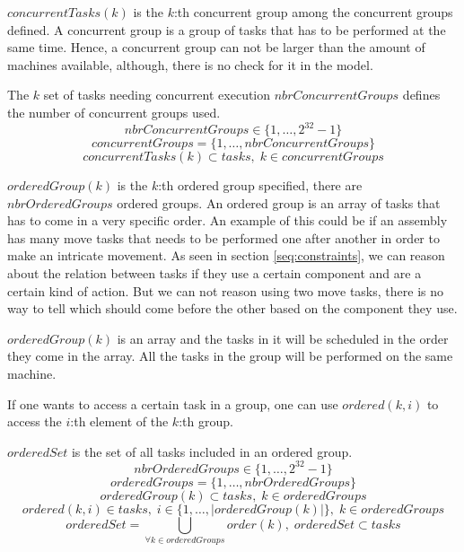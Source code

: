   \noindent $concurrentTasks(k)$ is the $k$:th concurrent group among the concurrent groups defined. A concurrent group is a group of tasks that has to be performed at the same time. Hence, a concurrent group can not be larger than the amount of machines available, although, there is no check for it in the model. 
 
 The $k$ set of tasks needing concurrent execution
 $nbrConcurrentGroups$ defines the number of concurrent groups used.  
 \begin{equation}\label{eq:8}
 nbrConcurrentGroups \in \{1 , \ldots , 2^{32}-1\}
 \end{equation}
 \begin{equation}\label{eq:17}
 concurrentGroups = \{1 , \ldots , nbrConcurrentGroups\}
 \end{equation}
 \begin{equation}\label{eq:30}
 concurrentTasks(k) \subset tasks, \; k \in concurrentGroups
 \end{equation}

  \noindent $orderedGroup(k)$ is the $k$:th ordered group specified, there are $nbrOrderedGroups$ ordered groups. An ordered group is an array of tasks that has to come in a very specific order. An example of this could be if an assembly has many move tasks that needs to be performed one after another in order to make an intricate movement. As seen in section \ref{seq:constraints}, we can reason about the relation between tasks if they use a certain component and are a certain kind of action. But we can not reason using two move tasks, there is no way to tell which should come before the other based on the component they use. 
  
  $orderedGroup(k)$ is an array and the tasks in it will be scheduled in the order they come in the array. All the tasks in the group will be performed on the same machine.
  
  If one wants to access a certain task in a group, one can use $ordered(k,i)$ to access the $i$:th element of the $k$:th group.
  
  $orderedSet$ is the set of all tasks included in an ordered group.
 \begin{equation}\label{eq:900}
 nbrOrderedGroups \in \{1 , \ldots , 2^{32}-1\}
 \end{equation}
 \begin{equation}\label{eq:9}
 orderedGroups = \{1 , \ldots , nbrOrderedGroups\}
 \end{equation}
 \begin{equation}\label{eq:18}
 orderedGroup(k) \subset tasks, \; k \in orderedGroups
 \end{equation}
 \begin{equation}\label{eq:32}
 ordered(k,i) \in tasks, \; i \in \{1 , \ldots , |orderedGroup(k)|\}, \; k \in orderedGroups
 \end{equation}
 \begin{equation}\label{eq:39}
 orderedSet = \bigcup_{\forall k \in orderedGroups}order(k), \; orderedSet \subset tasks
 \end{equation}

